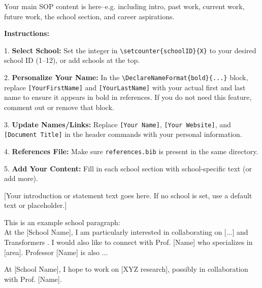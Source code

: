 \documentclass[11pt]{article}
\newcounter{schoolID}
\newcommand{\schoolname}{[School Name]}
\newcommand{\schoolname}{University of California, Berkeley}
\newcommand{\schoolname}{Stanford University}
\newcommand{\schoolname}{Massachusetts Institute of Technology}
\newcommand{\schoolname}{Carnegie Mellon University}
\newcommand{\schoolname}{Georgia Institute of Technology}
\newcommand{\schoolname}{New York University}
\newcommand{\schoolname}{Columbia University}
\newcommand{\schoolname}{Cornell University}
\newcommand{\schoolname}{University of Washington}
\newcommand{\schoolname}{University of Illinois at Urbana-Champaign}
\newcommand{\schoolname}{University of California, San Diego}
\newcommand{\schoolname}{Rice University}
\newcommand{\schoolname}{[School Name]}
\begin{document}
Your main SOP content is here--e.g. including intro, past work, current work, future work, the school section, and career aspirations.

\textbf{Instructions:}

1. \textbf{Select School:} Set the integer in \verb|\setcounter{schoolID}{X}| to your desired school ID (1--12), or add schools at the top.

2. \textbf{Personalize Your Name:} In the \verb|\DeclareNameFormat{bold}{...}| block, replace \verb|[YourFirstName]| and \verb|[YourLastName]| with your actual first and last name to ensure it appears in bold in references. If you do not need this feature, comment out or remove that block.

3. \textbf{Update Names/Links:} Replace \verb|[Your Name]|, \verb|[Your Website]|, and \verb|[Document Title]| in the header commands with your personal information.

4. \textbf{References File:} Make sure \verb|references.bib| is present in the same directory.

5. \textbf{Add Your Content:} Fill in each school section with school-specific text (or add more).





                         

\ifcase\value{schoolID}
  [Your introduction or statement text goes here. If no school is set, use a default text or placeholder.]

\or
  This is an example school paragraph: \\
  At the {\schoolname}, I am particularly interested in collaborating on [...] and Transformers \cite{vaswani2017attention}.
  I would also like to connect with Prof. [Name] who specializes in [area]. Professor [Name] is also ...

\or
  At {\schoolname}, I hope to work on [XYZ research], possibly in collaboration with Prof. [Name].
\end{document}
